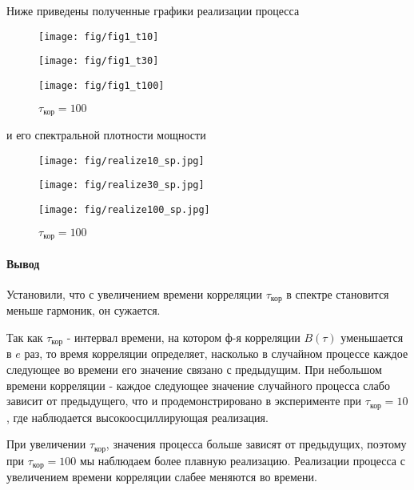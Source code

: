 \documentclass[a4paper,14pt]{extarticle}
\begin{document}
 Ниже приведены полученные графики реализации процесса
 \begin{figure}[H]
 	\begin{minipage}{0.3\linewidth}
 		\centering
        \texttt{[image: fig/fig1\_t10]}
 		\caption*{$\tau_\text{кор}=10$}
 	\end{minipage}
 \begin{minipage}{0.3\linewidth}
 	\centering
    \texttt{[image: fig/fig1\_t30]}
 	\caption*{$\tau_\text{кор}=30$}
 \end{minipage}
\begin{minipage}{0.3\linewidth}
	\centering
    \texttt{[image: fig/fig1\_t100]}
	\caption*{$\tau_\text{кор}=100$}
\end{minipage}
  \end{figure}
и его спектральной плотности мощности
 \begin{figure}[H]
	\begin{minipage}{0.3\linewidth}
		\centering
        \texttt{[image: fig/realize10\_sp.jpg]}
		\caption*{$\tau_\text{кор}=10$}
	\end{minipage}
	\begin{minipage}{0.3\linewidth}
		\centering
        \texttt{[image: fig/realize30\_sp.jpg]}
		\caption*{$\tau_\text{кор}=30$}
	\end{minipage}
	\begin{minipage}{0.3\linewidth}
		\centering
        \texttt{[image: fig/realize100\_sp.jpg]}
		\caption*{$\tau_\text{кор}=100$}
	\end{minipage}
\end{figure}
\paragraph{Вывод} Установили, что с увеличением времени корреляции $\tau_\text{кор}$ в спектре становится меньше гармоник, он сужается.

Так как $\tau_\text{кор}$ - интервал времени, на котором ф-я корреляции $B(\tau)$ уменьшается в $e$ раз, то время
корреляции определяет, насколько в случайном процессе каждое следующее во времени его значение связано с предыдущим. 
При небольшом времени корреляции - каждое следующее значение случайного процесса слабо зависит от предыдущего, что и
продемонстрировано в эксперименте при $\tau_\text{кор}=10$, где наблюдается высокоосциллирующая реализация.

При увеличении $\tau_\text{кор}$, значения процесса больше зависят от предыдущих, поэтому при
$\tau_\text{кор} = 100$ мы наблюдаем более плавную реализацию. Реализации процесса с увеличением времени корреляции
слабее меняются во времени.
\end{document}
